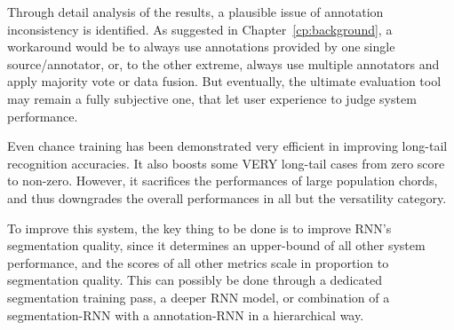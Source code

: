 Through detail analysis of the results, a plausible issue of annotation inconsistency is identified. As suggested in Chapter~\ref{cp:background}, a workaround would be to always use annotations provided by one single source/annotator, or, to the other extreme, always use multiple annotators and apply majority vote or data fusion. But eventually, the ultimate evaluation tool may remain a fully subjective one, that let user experience to judge system performance.

Even chance training has been demonstrated very efficient in improving long-tail recognition accuracies. It also boosts some VERY long-tail cases from zero score to non-zero. However, it sacrifices the performances of large population chords, and thus downgrades the overall performances in all but the versatility category.

To improve this system, the key thing to be done is to improve RNN's segmentation quality, since it determines an upper-bound of all other system performance, and the scores of all other metrics scale in proportion to segmentation quality. This can possibly be done through a dedicated segmentation training pass, a deeper RNN model, or combination of a segmentation-RNN with a annotation-RNN in a hierarchical way.





